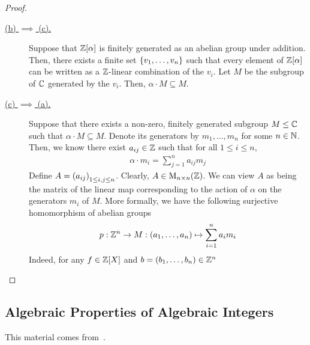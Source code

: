 \begin{proof}
\begin{description}
        \item[\underline{(b) $\implies$ (c).}] Suppose that $\mathbb{Z}\!\left[ \alpha \right]$ is finitely generated as an abelian group under addition. Then, there exists a finite set $\left\{ v_1, \ldots, v_n \right\}$ such that every element of $\mathbb{Z}\!\left[ \alpha \right]$ can be written as a $\mathbb{Z}$-linear combination of the $v_i$. Let $M$ be the subgroup of $\mathbb{C}$ generated by the $v_i$. Then, $\alpha \cdot M \subseteq M$.
        
        \item[\underline{(c) $\implies$ (a).}] Suppose that there exists a non-zero, finitely generated subgroup $M \leq \mathbb{C}$ such that $\alpha \cdot M \subseteq M$. Denote its generators by $m_1, \ldots, m_n$ for some $n \in \mathbb{N}$. Then, we know there exist $a_{ij} \in \mathbb{Z}$ such that for all $1 \leq i \leq n$,
        \begin{align*}
            \alpha \cdot m_i = \sum_{j=1}^{n} a_{ij} m_j
        \end{align*}
        Define $A = \left( a_{ij} \right)_{1 \leq i, j \leq n}$. Clearly, $A \in \operatorname{M}_{{n} \times {n}}\!\left( {\mathbb{Z}} \right)$. We can view $A$ as being the matrix of the linear map corresponding to the action of $\alpha$ on the generators $m_i$ of $M$. More formally, we have the following surjective homomorphism of abelian groups
        \begin{align*}
            p :
            \mathbb{Z}^n \to M :
            \left( a_1, \ldots, a_n \right) \mapsto \sum_{i=1}^{n} a_i m_i
        \end{align*}
        Indeed, for any $f \in \mathbb{Z}[X]$ and $b = \left( b_1, \ldots, b_n \right) \in \mathbb{Z}^n$

        \sorry
    \end{description}
    
\end{proof}

\subsection{Algebraic Properties of Algebraic Integers}

This material comes from~\cite[Theorem 3.1]{GeorgeBoxer}.


